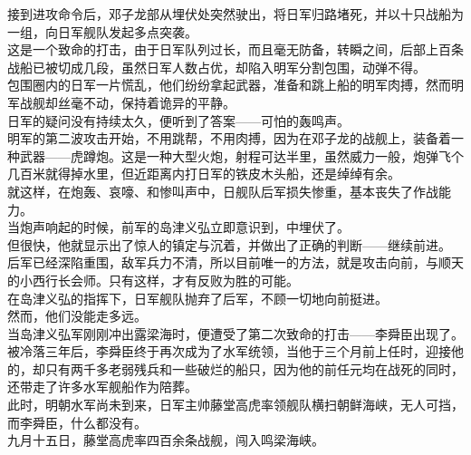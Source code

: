 \begin{multicols}{\theparacolNo}
接到进攻命令后，邓子龙部从埋伏处突然驶出，将日军归路堵死，并以十只战船为一组，向日军舰队发起多点突袭。\\

这是一个致命的打击，由于日军队列过长，而且毫无防备，转瞬之间，后部上百条战船已被切成几段，虽然日军人数占优，却陷入明军分割包围，动弹不得。\\

包围圈内的日军一片慌乱，他们纷纷拿起武器，准备和跳上船的明军肉搏，然而明军战舰却丝毫不动，保持着诡异的平静。\\

日军的疑问没有持续太久，便听到了答案——可怕的轰鸣声。\\

明军的第二波攻击开始，不用跳帮，不用肉搏，因为在邓子龙的战舰上，装备着一种武器——虎蹲炮。这是一种大型火炮，射程可达半里，虽然威力一般，炮弹飞个几百米就得掉水里，但近距离内打日军的铁皮木头船，还是绰绰有余。\\

就这样，在炮轰、哀嚎、和惨叫声中，日舰队后军损失惨重，基本丧失了作战能力。\\

当炮声响起的时候，前军的岛津义弘立即意识到，中埋伏了。\\

但很快，他就显示出了惊人的镇定与沉着，并做出了正确的判断——继续前进。\\

后军已经深陷重围，敌军兵力不清，所以目前唯一的方法，就是攻击向前，与顺天的小西行长会师。只有这样，才有反败为胜的可能。\\

在岛津义弘的指挥下，日军舰队抛弃了后军，不顾一切地向前挺进。\\

然而，他们没能走多远。\\

当岛津义弘军刚刚冲出露梁海时，便遭受了第二次致命的打击——李舜臣出现了。\\

被冷落三年后，李舜臣终于再次成为了水军统领，当他于三个月前上任时，迎接他的，却只有两千多老弱残兵和一些破烂的船只，因为他的前任元均在战死的同时，还带走了许多水军舰船作为陪葬。\\

此时，明朝水军尚未到来，日军主帅藤堂高虎率领舰队横扫朝鲜海峡，无人可挡，而李舜臣，什么都没有。\\

九月十五日，藤堂高虎率四百余条战舰，闯入鸣梁海峡。\\


\end{multicols}

